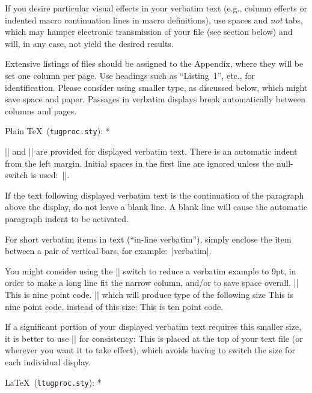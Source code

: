 If you desire particular visual effects in your verbatim text (e.g.,
column effects or indented macro continuation lines in macro
definitions), use spaces and {\it not\/} tabs, which may hamper
electronic transmission of your file (see section below) and will, in
any case, not yield the desired results.

Extensive listings of files should be assigned to the Appendix, where
they will be set one column per page.  Use headings such as
``Listing~1'', etc., for identification.  Please consider using smaller
type, as discussed below, which might save space and paper.  Passages in
verbatim displays break automatically between columns and pages.

\subsubhead * Plain \TeX\ ({\tt tugproc.sty}): *

|\verbatim| and |\endverbatim| are provided for displayed verbatim text.
There is an automatic indent from the left margin.  Initial spaces in
the first line are ignored unless the null-switch is used:\
|\verbatim[]|.

If the text following displayed verbatim text is the continuation of the
paragraph above the display, do not leave a blank line.  A blank line
will cause the automatic paragraph indent to be activated.

For short verbatim items in text (``in-line verbatim''), simply enclose
the item between a pair of vertical bars, for example:\
\verbatim[\inline]|verbatim|\endverbatim.

You might consider using the |\smallcode| switch to reduce a verbatim
example to 9pt, in order to make a long line fit the narrow column,
and/or to save space overall.\endgraf
||
\verbatim[\smallcode]
This is nine point code.
\endverbatim
||
which will produce type of the following size
\verbatim[\smallcode]
This is nine point code.
\endverbatim
instead of this size:
\verbatim
This is ten point code.
\endverbatim

If a significant portion of your displayed verbatim text requires this
smaller size, it is better to use |\everyverbatim| for consistency:\endgraf
\verbatim[\smallcode]
\everyverbatim{\displaystyle{\smallcode}}
\endverbatim
This is placed at the top of your text file (or wherever you want it to
take effect), which avoids having to switch the size for each individual
display.

\subsubhead * \LaTeX\ ({\tt ltugproc.sty}): *

